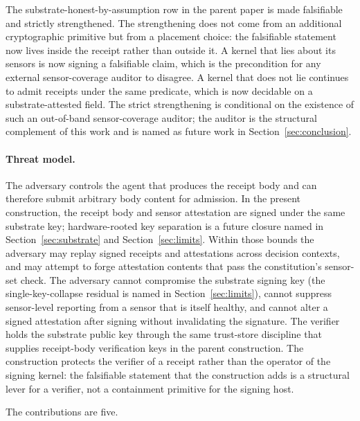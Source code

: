 The substrate-honest-by-assumption row in the parent paper is made falsifiable and strictly strengthened. The strengthening does not come from an additional cryptographic primitive but from a placement choice: the falsifiable statement now lives inside the receipt rather than outside it. A kernel that lies about its sensors is now signing a falsifiable claim, which is the precondition for any external sensor-coverage auditor to disagree. A kernel that does not lie continues to admit receipts under the same predicate, which is now decidable on a substrate-attested field. The strict strengthening is conditional on the existence of such an out-of-band sensor-coverage auditor; the auditor is the structural complement of this work and is named as future work in Section~\ref{sec:conclusion}.

\paragraph{Threat model.}
The adversary controls the agent that produces the receipt body and can therefore submit arbitrary body content for admission. In the present construction, the receipt body and sensor attestation are signed under the same substrate key; hardware-rooted key separation is a future closure named in Section~\ref{sec:substrate} and Section~\ref{sec:limits}. Within those bounds the adversary may replay signed receipts and attestations across decision contexts, and may attempt to forge attestation contents that pass the constitution's sensor-set check. The adversary cannot compromise the substrate signing key (the single-key-collapse residual is named in Section~\ref{sec:limits}), cannot suppress sensor-level reporting from a sensor that is itself healthy, and cannot alter a signed attestation after signing without invalidating the signature. The verifier holds the substrate public key through the same trust-store discipline that supplies receipt-body verification keys in the parent construction. The construction protects the verifier of a receipt rather than the operator of the signing kernel: the falsifiable statement that the construction adds is a structural lever for a verifier, not a containment primitive for the signing host.

The contributions are five.

